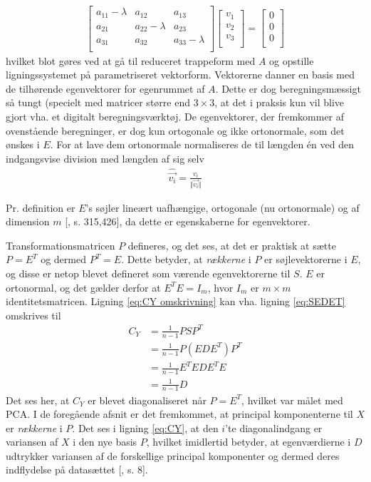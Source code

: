 \begin{align*}
\begin{bmatrix}
a_{11} - \lambda & a_{12} & a_{13}\\
a_{21} & a_{22} - \lambda & a_{23}\\
a_{31} & a_{32} & a_{33} - \lambda\\
\end{bmatrix}
\begin{bmatrix}
v_{1} \\
v_{2} \\
v_{3} \\
\end{bmatrix}=
\begin{bmatrix}
0\\0\\0\\
\end{bmatrix}
\end{align*}
hvilket blot gøres ved at gå til reduceret trappeform med $A$ og opstille ligningssystemet på parametriseret vektorform. Vektorerne danner en basis med de tilhørende egenvektorer for egenrummet af $A$. Dette er dog beregningsmæssigt så tungt (specielt med matricer større end $3 \times 3$, at det i praksis kun vil blive gjort vha. et digitalt beregningsværktøj. De egenvektorer, der fremkommer af ovenstående beregninger, er dog kun ortogonale og ikke ortonormale, som det ønskes i $E$. For at lave dem ortonormale normaliseres de til længden én ved den indgangsvise division med længden af sig selv
\begin{align}
\hat{\vec{v_i}} = \frac{v_i}{\Vert\vec{v_i}\Vert}
\label{eq:ortonormal}
\end{align}

Pr. definition er $E$'s søjler lineært uafhængige, ortogonale (nu ortonormale) og af dimension $m$ [\citet{linalg}, s. 315,426], da dette er egenskaberne for egenvektorer.

Transformationsmatricen $P$ defineres, og det ses, at det er praktisk at sætte $P = E^T$ og dermed $P^T = E$. Dette betyder, at \emph{rækkerne} i $P$ er søjlevektorerne i $E$, og disse er netop blevet defineret som værende egenvektorerne til $S$. $E$ er ortonormal, og det gælder derfor at $E^TE = I_m$, hvor $I_m$ er $m \times m$ identitetsmatricen. Ligning \ref{eq:CY omskrivning} kan vha. ligning \ref{eq:SEDET} omskrives til
\begin{align}
C_Y 	& = \frac{1}{n-1} PSP^T \		\nonumber	\\
	& = \frac{1}{n-1} P(EDE^T)P^T	\nonumber	\\
	& = \frac{1}{n-1} E^TEDE^TE		\nonumber	\\
	& = \frac{1}{n-1} D
\label{eq:CY}
\end{align}
Det ses her, at $C_Y$ er blevet diagonaliseret når $P=E^T$, hvilket var målet med PCA. I de foregående afsnit er det fremkommet, at principal komponenterne til $X$ er \emph{rækkerne} i $P$. Det ses i ligning \ref{eq:CY}, at den $i$'te diagonalindgang er variansen af $X$ i den nye basis $P$, hvilket imidlertid betyder, at egenværdierne i $D$ udtrykker variansen af de forskellige principal komponenter og dermed deres indflydelse på datasættet [\citet{PCA_people}, s. 8].




